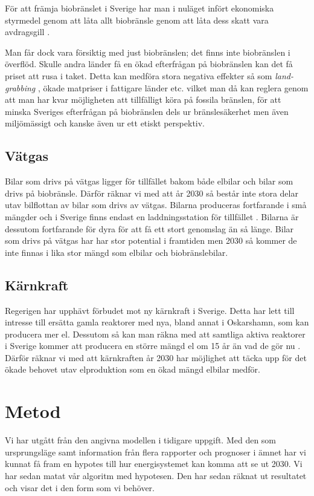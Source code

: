 \documentclass[a4paper,11pt,fleqn, titlepage]{article}
\begin{document}
För att främja biobränslet i Sverige har man i nuläget infört ekonomiska styrmedel
genom att låta allt biobränsle genom att låta dess skatt vara
avdragsgill \cite{ekonomiskastyrmedel}.

Man får dock vara försiktig med just biobränslen; det finns inte
biobränslen i överflöd. Skulle andra länder få en ökad efterfrågan på
biobränslen kan det få priset att rusa i taket. Detta kan medföra stora
negativa effekter så som \emph{land-grabbing} \cite{bioenergi}, ökade matpriser i
fattigare länder etc. vilket man då kan reglera genom att man har kvar
möjligheten att tillfälligt köra på fossila bränslen, för att minska
Sveriges efterfrågan på biobränslen dels ur bränslesäkerhet men även
miljömässigt och kanske även ur ett etiskt perspektiv.

\subsection{Vätgas}
Bilar som drivs på vätgas ligger för tillfället bakom både elbilar och
bilar som drivs på biobränsle. Därför räknar vi med att år 2030 så
består inte stora delar utav bilflottan av bilar som drivs av vätgas.
Bilarna produceras fortfarande i små mängder och i Sverige finns endast en
laddningsstation för tillfället \cite{macken}.
Bilarna är dessutom fortfarande för dyra för att få ett stort genomslag än så länge. Bilar som drivs på vätgas har har stor potential i framtiden men 2030 så kommer de inte finnas i lika stor mängd som elbilar och biobränslebilar.

\subsection{Kärnkraft}
Regerigen har upphävt förbudet mot ny kärnkraft i Sverige. Detta har lett till intresse till ersätta gamla reaktorer med nya, bland annat i Oskarshamn, som kan producera mer el.
Dessutom så kan man räkna med att samtliga aktiva reaktorer i Sverige
kommer att producera en större mängd el om 15 år än vad de gör nu
\cite[s.~80]{karnkraft}. Därför räknar vi med att kärnkraften år 2030 har möjlighet att täcka upp för det ökade behovet utav elproduktion som en ökad mängd elbilar medför.

\section{Metod}
Vi har utgått från den angivna modellen i tidigare uppgift. Med den som
ursprungsläge samt information från flera rapporter och prognoser i ämnet
har vi kunnat få fram en hypotes till hur energisystemet kan komma att se
ut 2030. Vi har sedan matat vår algoritm med hypotesen. Den har sedan räknat ut
resultatet och visar det i den form som vi behöver.
\end{document}
